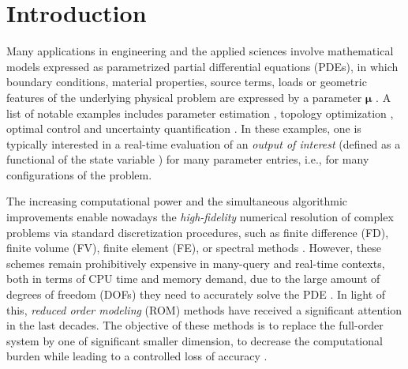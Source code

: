 \documentclass[longtitle]{elsarticle}
\numberwithin{equation}{section}
\theoremstyle{theorem}
\theoremstyle{definition}
\theoremstyle{remark}
\theoremstyle{proposition}
\numberwithin{figure}{section}
\newcommand{\bg}[1]{\boldsymbol{#1}}
\begin{document}
	
	
	\section{Introduction}
	\label{section:Introduction}
		
		Many applications in engineering and the applied sciences involve mathematical models expressed as parametrized partial differential equations (PDEs), in which boundary conditions, material properties, source terms, loads or geometric features of the underlying physical problem are expressed by a parameter $\bg{\mu}$ \cite{Eft08, HSR16, JIR14}. A list of notable examples includes parameter estimation \cite{Bro93}, topology optimization \cite{Ben04}, optimal control \cite{LM67} and uncertainty quantification \cite{LeM10}. In these examples, one is typically interested in a real-time evaluation of an \emph{output of interest} (defined as a functional of the state variable \cite{Dep08}) for many parameter entries, i.e., for many configurations of the problem.  
		
		The increasing computational power and the simultaneous algorithmic improvements enable nowadays the \emph{high-fidelity} numerical resolution of complex problems via standard discretization procedures, such as finite difference (FD), finite volume (FV), finite element (FE), or spectral methods \cite{QMN15}. However, these schemes remain prohibitively expensive in many-query and real-time contexts, both in terms of CPU time and memory demand, due to the large amount of degrees of freedom (DOFs) they need to accurately solve the PDE \cite{Ams10}. In light of this, \emph{reduced order modeling} (ROM) methods have received a significant attention in the last decades. The objective of these methods is to replace the full-order system by one of significant smaller dimension, to decrease the computational burden while leading to a controlled loss of accuracy \cite{Chen17}. 
		
\end{document}
